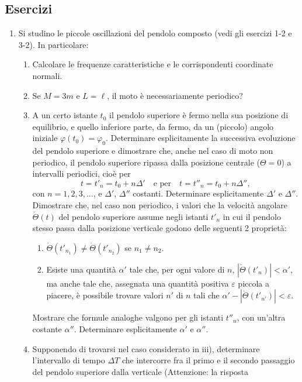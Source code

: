 \documentclass[11pt, a4paper]{book}
\numberwithin{equation}{section}
\newenvironment{esercizi}{\subsection*{Esercizi}\begin{enumerate}}{\end{enumerate}}
\begin{document}
\begin{esercizi}
    \item Si studino le piccole oscillazioni del pendolo composto (vedi gli
    esercizi 1-2 e 3-2). In particolare:
    \begin{enumerate}
        \item Calcolare le frequenze caratteristiche e le corrispondenti
        coordinate normali.
        \item Se $M=3m$ e $L=\ell$, il moto è necessariamente periodico?
        \item A un certo istante $t_0$ il pendolo superiore è fermo nella sua
        posizione di equilibrio, e quello inferiore parte, da fermo, da un
        (piccolo) angolo iniziale $\varphi(t_0) = \varphi_0$. Determinare
        esplicitamente la successiva evoluzione del pendolo superiore e
        dimostrare che, anche nel caso di moto non periodico, il pendolo
        superiore ripassa dalla posizione centrale ($\Theta=0$) a intervalli
        periodici, cioè per
        \[
            t = t'_n = t_0 + n\Delta' \quad \text{e per} \quad t = t''_n = t_0 + n\Delta'',
        \]
        con $n=1,2,3,\ldots$, e $\Delta'$, $\Delta''$ costanti. Determinare
        esplicitamente $\Delta'$ e $\Delta''$. Dimostrare che, nel caso non
        periodico, i valori che la velocità angolare $\dot{\Theta}(t)$ del
        pendolo superiore assume negli istanti $t'_n$ in cui il pendolo stesso
        passa dalla posizione verticale godono delle seguenti 2 proprietà:
        \begin{enumerate}
            \item $\dot{\Theta}(t'_{n_1}) \neq \dot{\Theta}(t'_{n_2})$ \quad se $n_1 \neq n_2$.
            \item Esiste una quantità $\alpha'$ tale che, per ogni valore di $n$,
            $|\dot{\Theta}(t'_n)| < \alpha'$, ma anche tale che, assegnata una
            quantità positiva $\varepsilon$ piccola a piacere, è possibile trovare
            valori $n'$ di $n$ tali che $\alpha' - |\dot{\Theta}(t'_{n'})| < \varepsilon$.
        \end{enumerate}
        Mostrare che formule analoghe valgono per gli istanti $t''_n$, con
        un'altra costante $\alpha''$. Determinare esplicitamente $\alpha'$ e $\alpha''$.
        \item Supponendo di trovarsi nel caso considerato in iii), determinare
        l'intervallo di tempo $\Delta T$ che intercorre fra il primo e il secondo
        passaggio del pendolo superiore dalla verticale (Attenzione: la risposta

\end{enumerate}
\end{esercizi}
\end{document}
